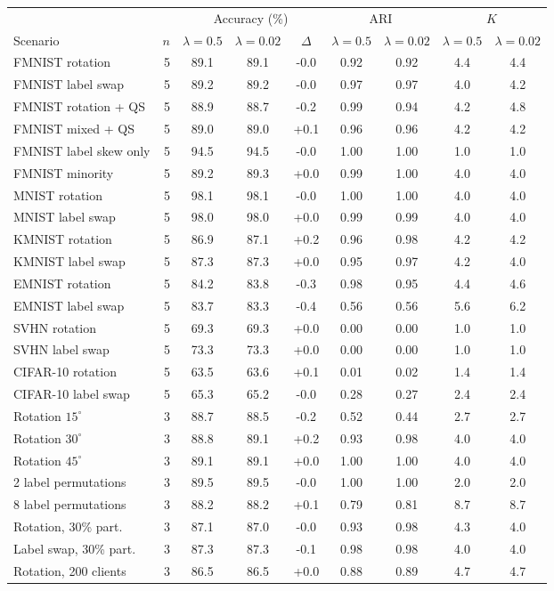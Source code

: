 \scriptsize
\setlength{\tabcolsep}{3pt}
\begin{tabular}{lrccccccc}
\toprule
 & & \multicolumn{3}{c}{Accuracy (\%)} & \multicolumn{2}{c}{ARI} & \multicolumn{2}{c}{$K$} \\
\cmidrule(lr){3-5}\cmidrule(lr){6-7}\cmidrule(lr){8-9}
Scenario & $n$ & $\lambda=0.5$ & $\lambda=0.02$ & $\Delta$ & $\lambda=0.5$ & $\lambda=0.02$ & $\lambda=0.5$ & $\lambda=0.02$ \\
\midrule
FMNIST rotation & 5 & 89.1 & 89.1 & -0.0 & 0.92 & 0.92 & 4.4 & 4.4 \\
FMNIST label swap & 5 & 89.2 & 89.2 & -0.0 & 0.97 & 0.97 & 4.0 & 4.2 \\
FMNIST rotation + QS & 5 & 88.9 & 88.7 & -0.2 & 0.99 & 0.94 & 4.2 & 4.8 \\
FMNIST mixed + QS & 5 & 89.0 & 89.0 & +0.1 & 0.96 & 0.96 & 4.2 & 4.2 \\
FMNIST label skew only & 5 & 94.5 & 94.5 & -0.0 & 1.00 & 1.00 & 1.0 & 1.0 \\
FMNIST minority & 5 & 89.2 & 89.3 & +0.0 & 0.99 & 1.00 & 4.0 & 4.0 \\
MNIST rotation & 5 & 98.1 & 98.1 & -0.0 & 1.00 & 1.00 & 4.0 & 4.0 \\
MNIST label swap & 5 & 98.0 & 98.0 & +0.0 & 0.99 & 0.99 & 4.0 & 4.0 \\
KMNIST rotation & 5 & 86.9 & 87.1 & +0.2 & 0.96 & 0.98 & 4.2 & 4.2 \\
KMNIST label swap & 5 & 87.3 & 87.3 & +0.0 & 0.95 & 0.97 & 4.2 & 4.0 \\
EMNIST rotation & 5 & 84.2 & 83.8 & -0.3 & 0.98 & 0.95 & 4.4 & 4.6 \\
EMNIST label swap & 5 & 83.7 & 83.3 & -0.4 & 0.56 & 0.56 & 5.6 & 6.2 \\
SVHN rotation & 5 & 69.3 & 69.3 & +0.0 & 0.00 & 0.00 & 1.0 & 1.0 \\
SVHN label swap & 5 & 73.3 & 73.3 & +0.0 & 0.00 & 0.00 & 1.0 & 1.0 \\
CIFAR-10 rotation & 5 & 63.5 & 63.6 & +0.1 & 0.01 & 0.02 & 1.4 & 1.4 \\
CIFAR-10 label swap & 5 & 65.3 & 65.2 & -0.0 & 0.28 & 0.27 & 2.4 & 2.4 \\
Rotation $15^\circ$ & 3 & 88.7 & 88.5 & -0.2 & 0.52 & 0.44 & 2.7 & 2.7 \\
Rotation $30^\circ$ & 3 & 88.8 & 89.1 & +0.2 & 0.93 & 0.98 & 4.0 & 4.0 \\
Rotation $45^\circ$ & 3 & 89.1 & 89.1 & +0.0 & 1.00 & 1.00 & 4.0 & 4.0 \\
2 label permutations & 3 & 89.5 & 89.5 & -0.0 & 1.00 & 1.00 & 2.0 & 2.0 \\
8 label permutations & 3 & 88.2 & 88.2 & +0.1 & 0.79 & 0.81 & 8.7 & 8.7 \\
Rotation, 30\% part. & 3 & 87.1 & 87.0 & -0.0 & 0.93 & 0.98 & 4.3 & 4.0 \\
Label swap, 30\% part. & 3 & 87.3 & 87.3 & -0.1 & 0.98 & 0.98 & 4.0 & 4.0 \\
Rotation, 200 clients & 3 & 86.5 & 86.5 & +0.0 & 0.88 & 0.89 & 4.7 & 4.7 \\
\bottomrule
\end{tabular}
